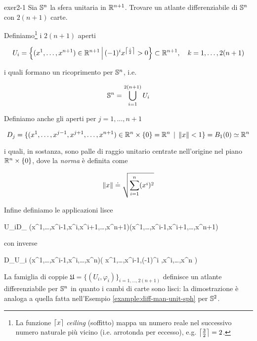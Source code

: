 {exer2-1}
{
Sia $ \S^{n} $ la sfera unitaria in $ \R^{n+1} $. Trovare un atlante differenziabile di $ \S^{n} $ con $ 2(n+1) $ carte.
}
{
Definiamo\footnote{%
	La funzione $ \ceil*{x} $ \textit{ceiling} (soffitto) mappa un numero reale nel successivo numero naturale più vicino (i.e. arrotonda per eccesso), e.g. $ \ceil*{\frac{3}{2}} = 2 $.%
} i $ 2(n+1) $ aperti

\begin{equation}
	U_{i} = \left\{ (x^{1},\dots,x^{n+1}) \in \R^{n+1} \st (-1)^{i} x^{\ceil*{\frac{i}{2}}} > 0 \right\} \subset \R^{n+1} %
	\qcomma k = 1, \dots, 2(n+1)
\end{equation}

i quali formano un ricoprimento per $ \S^{n} $, i.e.

\begin{equation}
	\S^{n} = \bigcup_{i=1}^{2(n+1)} U_{i}
\end{equation}

Definiamo anche gli aperti per $ j = 1,\dots,n+1 $

\begin{equation}
	D_{j} = \{ (x^{1},\dots,x^{j-1},x^{j+1},\dots,x^{n+1}) \in \R^{n} \times \{0\} = \R^{n} \, \mid \, \norm{x} < 1 \} = B_{1}(0) \simeq \R^{n}
\end{equation}

i quali, in sostanza, sono palle di raggio unitario centrate nell'origine nel piano $ \R^{n} \times \{0\} $, dove la \textit{norma} è definita come

\begin{equation}
	\norm{x} \doteq \sqrt{ \sum_{i=1}^{n} (x^{i})^{2} }
\end{equation}

Infine definiamo le applicazioni lisce

	{U_{i}}{D_{}}
	{(x^{1},\dots,x^{i-1},x^{i},x^{i+1},\dots,x^{n+1})}{(x^{1},\dots,x^{i-1},x^{i+1},\dots,x^{n+1})}

con inverse

	{D_{}}{U_{i}}
	{(x^{1},\dots,x^{i-1},x^{i},\dots,x^{n})}{\left( x^{1},\dots,x^{i-1},(-1)^{i} ,x^{i},\dots,x^{n} \right)}

La famiglia di coppie $ \mathfrak{U} = \{ (U_{i},\varphi_{i}) \}_{i=1,\dots,2(n+1)} $ definisce un atlante differenziabile per $ \S^{n} $ in quanto i cambi di carte sono lisci: la dimostrazione è analoga a quella fatta nell'Esempio \ref{example:diff-man-unit-sph} per $ \S^{2} $.
}

